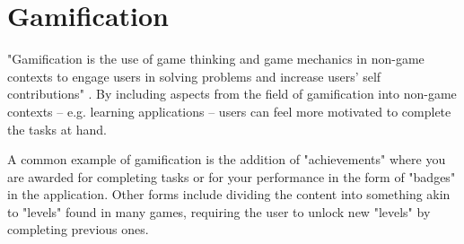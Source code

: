 
\section{Gamification}

"Gamification is the use of game thinking and game mechanics in non-game contexts to engage users in solving problems and increase users' self contributions" \citep{WikipediaOnGamification}. By including aspects from the field of gamification into non-game contexts – e.g. learning applications – users can feel more motivated to complete the tasks at hand.

A common example of gamification is the addition of "achievements" where you are awarded for completing tasks or for your performance in the form of "badges" in the application. Other forms include dividing the content into something akin to "levels" found in many games, requiring the user to unlock new "levels" by completing previous ones.